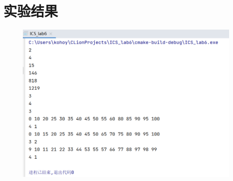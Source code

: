 \documentclass[UTF8]{ctexart}
\begin{document}
\section{实验结果}
\begin{figure}[htbp]
    \centering
    \includegraphics*[]{r.png}
\end{figure}
\end{document}
